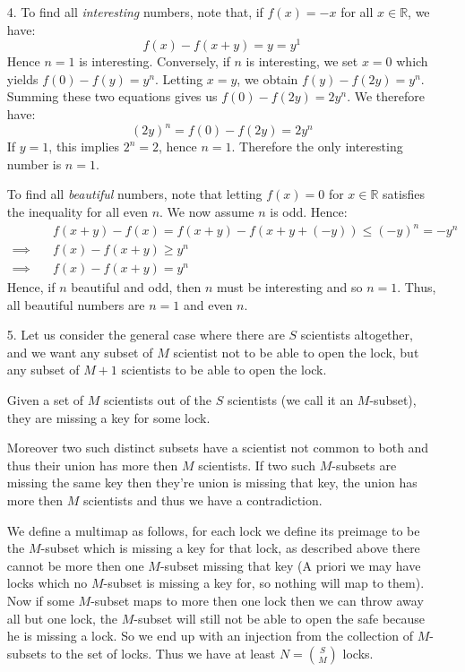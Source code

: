 \documentclass[a4paper, 12pt]{article}
\begin{document}
\begin{enumerate}
    \item[4.] To find all \textit{interesting} numbers, note that, if $f(x) = -x$ for all $x \in \mathbb{R}$, we have:
    $$ f(x) - f(x+y) = y = y^1 $$
    Hence $n=1$ is interesting. Conversely, if $n$ is interesting, we set $x = 0$ which yields $f(0) - f(y) = y^n$. Letting $x = y$, we obtain $f(y) - f(2y) = y^n$. Summing these two equations gives us $f(0) - f(2y) = 2y^n$. We therefore have:
    $$ (2y)^n = f(0) - f(2y) = 2y^n $$
    If $y = 1$, this implies $2^n = 2$, hence $n = 1$. Therefore the only interesting number is $n = 1$.
    
    To find all \textit{beautiful} numbers, note that letting $f(x) = 0$ for $x \in \mathbb{R}$ satisfies the inequality for all even $n$. We now assume $n$ is odd. Hence:
    \begin{align*}
        &f(x+y)-f(x)=f(x+y)-f(x+y+(-y)) \leq (-y)^n=-y^n \\
        \implies \quad &f(x)-f(x+y)\geq y^n \\
        \implies \quad &f(x)-f(x+y)=y^n
    \end{align*}
    Hence, if $n$ beautiful and odd, then $n$ must be interesting and so $n = 1$. Thus, all beautiful numbers are $n = 1$ and even $n$.
    
    
    \item[5.] Let us consider the general case where there are $S$ scientists altogether, and we want any subset of $M$ scientist not to be able to open the lock, but any subset of $M+1$ scientists to be able to open the lock.

Given a set of $M$ scientists out of the $S$ scientists (we call it an $M$-subset), they are missing a key for some lock.

Moreover two such distinct subsets have a scientist not common to both and thus their union has more then $M$ scientists. If two such $M$-subsets are missing the same key then they're union is missing that key, the union has more then $M$ scientists and thus we have a contradiction.

We define a multimap as follows, for each lock we define its preimage to be the $M$-subset which is missing a key for that lock, as described above there cannot be more then one $M$-subset missing that key (A priori we may have locks which no $M$-subset is missing a key for, so nothing will map to them). Now if some $M$-subset maps to more then one lock then we can throw away all but one lock, the $M$-subset will still not be able to open the safe because he is missing a lock. So we end up with an injection from the collection of $M$-subsets to the set of locks. Thus we have at least $N = {S \choose M}$ locks.


\end{enumerate}
\end{document}
